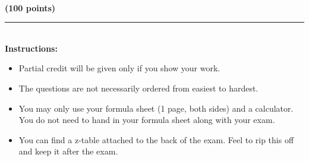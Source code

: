 \documentclass[12pt]{article}
\begin{document}
\begin{center}
  \textbf{\large \semester{}} \hfill \textbf{\large \class{}} \hfill \textbf{\large \exam{}}\\
  \hfill \textbf{(100 points)}
\end{center}

\vspace*{1in}

 \rule{5in}{.01in}\\[1in]

\textbf{Instructions:}\\
\begin{itemize}
\item {\large Partial credit will be given only if you show your work.}
\item {\large The questions are not necessarily ordered from easiest to hardest.}
\item {\large You may only use your formula sheet (1 page, both sides) and a calculator. You do not need to hand in your formula sheet along with your exam.}
\item {\large You can find a z-table attached to the back of the exam. Feel to rip this off and keep it after the exam.}
\end{itemize}
\end{document}
